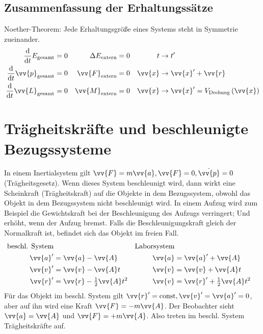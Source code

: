 \documentclass[a4paper,12pt]{article}
\numberwithin{equation}{section}
\begin{document}
\subsection{Zusammenfassung der Erhaltungssätze}
Noether-Theorem: Jede Erhaltungsgröße eines Systems steht in Symmetrie zueinander.
\begin{align*}
        \dfrac{\text{d}}{\text{d}t}E_{\text{gesamt}}&=0&\Delta E_{\text{extern}}&=0&t&\rightarrow t'\\
        \dfrac{\text{d}}{\text{d}t}\vv{p}_{\text{gesamt}}&=0&\vv{F}_{\text{extern}}&=0&\vv{x}&\rightarrow \vv{x}'+\vv{r}\\
        \dfrac{\text{d}}{\text{d}t}\vv{L}_{\text{gesamt}}&=0&\vv{M}_{\text{extern}}&=0&\vv{x}&\rightarrow \vv{x}'=V_{\text{Drehung}}\left(\vv{x}\right)
\end{align*}

\section{Trägheitskräfte und beschleunigte Bezugssysteme}
In einem Inertialsystem gilt $\vv{F}=m\vv{a},\vv{F}=0,\dot{\vv{p}}=0$ (Trägheitsgesetz). Wenn dieses System beschleunigt wird, dann wirkt eine Scheinkraft (Trägheitskraft) auf die Objekte in dem Bezugssystem, obwohl das Objekt in dem Bezugssystem nicht beschleunigt wird. In einem Aufzug wird zum Beispiel die Gewichtskraft bei der Beschleunigung des Aufzugs verringert; Und erhöht, wenn der Aufzug bremst. Falls die Beschleunigungskraft gleich der Normalkraft ist, befindet sich das Objekt im freien Fall.
\begin{align*}
        \text{beschl. System}&&\text{Laborsystem}\\
        \vv{a}'&=\vv{a}-\vv{A}&\vv{a}&=\vv{a}'+\vv{A}\\
        \vv{v}'&=\vv{v}-\vv{A}t&\vv{v}&=\vv{v}+\vv{A}t\\
        \vv{r}'&=\vv{r}-\tfrac{1}{2}\vv{A}t^2&\vv{v}&=\vv{r}'+\tfrac{1}{2}\vv{A}t^2
\end{align*}
Für das Objekt im beschl. System gilt $\vv{r}'=\text{const},\vv{v}'=\vv{a}'=0$, aber auf ihn wird eine Kraft $\vv{F}=-m\vv{A}$. Der Beobachter sieht $\vv{a}=\vv{A}$ und $\vv{F}=+m\vv{A}$. Also treten im beschl. System Trägheitskräfte auf.
\end{document}
